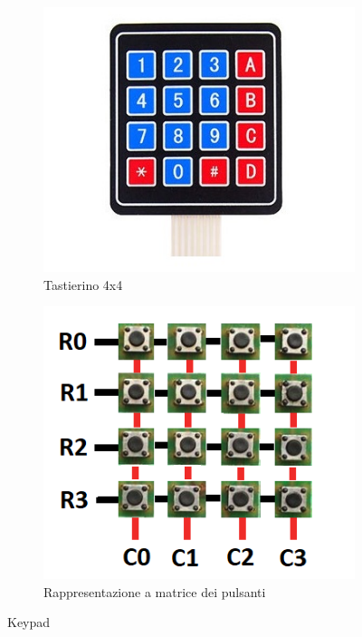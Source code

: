 \documentclass[12pt]{report}
\begin{document}
\begin{figure}
	\centering
	\begin{subfigure}{.5\textwidth}
		\centering
		\includegraphics[width=0.8\linewidth]{./img/keypad.jpg}
		\caption{Tastierino 4x4}
		\label{fig:keypad}
	\end{subfigure}%
	\begin{subfigure}{.5\textwidth}
		\centering
		\includegraphics[width=0.78\linewidth]{./img/keypad_matrix.png}
		\caption{Rappresentazione a matrice dei pulsanti}
		\label{fig:keypad_matrix}
	\end{subfigure}
	\caption{Keypad}
	\label{fig:keypad_both}
\end{figure}
\end{document}
